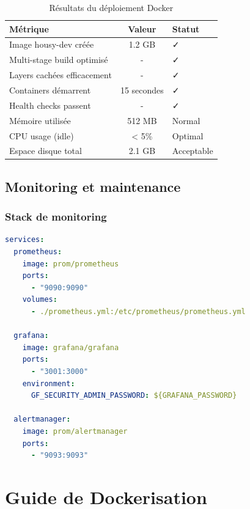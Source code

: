 \documentclass[12pt,a4paper]{report}
\begin{document}
\begin{table}[H]
    \centering
    \caption{Résultats du déploiement Docker}
    \begin{tabular}{|l|c|l|}
        \hline
        \textbf{Métrique} & \textbf{Valeur} & \textbf{Statut} \\
        \hline
        Image housy-dev créée & 1.2 GB & \textcolor{verthousy}{✓} \\
        \hline
        Multi-stage build optimisé & - & \textcolor{verthousy}{✓} \\
        \hline
        Layers cachées efficacement & - & \textcolor{verthousy}{✓} \\
        \hline
        Containers démarrent & 15 secondes & \textcolor{verthousy}{✓} \\
        \hline
        Health checks passent & - & \textcolor{verthousy}{✓} \\
        \hline
        Mémoire utilisée & 512 MB & Normal \\
        \hline
        CPU usage (idle) & < 5\% & Optimal \\
        \hline
        Espace disque total & 2.1 GB & Acceptable \\
        \hline
    \end{tabular}
\end{table}

\section{Monitoring et maintenance}

\subsection{Stack de monitoring}

\begin{lstlisting}[caption=Configuration Prometheus et Grafana, language=yaml]
services:
  prometheus:
    image: prom/prometheus
    ports:
      - "9090:9090"
    volumes:
      - ./prometheus.yml:/etc/prometheus/prometheus.yml

  grafana:
    image: grafana/grafana
    ports:
      - "3001:3000"
    environment:
      GF_SECURITY_ADMIN_PASSWORD: ${GRAFANA_PASSWORD}

  alertmanager:
    image: prom/alertmanager
    ports:
      - "9093:9093"
\end{lstlisting}

\chapter{Guide de Dockerisation}
\end{document}
